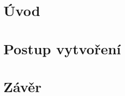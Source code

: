 \documentclass[czech,maturita,a4paper]{diploma}
\begin{document}
\MakeTitlePages
\chapter{Úvod}





\chapter{Postup vytvoření}





\chapter{Závěr}

\printbibliography[title={Literatura}]

\end{document}
